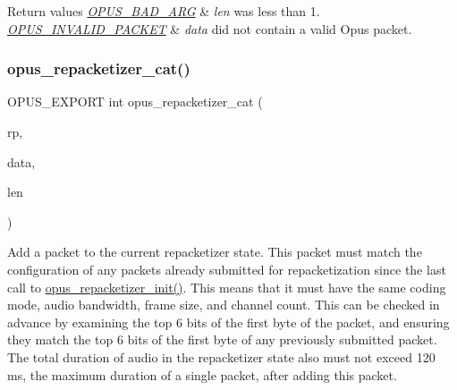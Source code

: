 \begin{DoxyRetVals}{Return values}
{\em \hyperlink{group__opus__errorcodes_gaf2d43e479455a1a3b6874e5faf4e827d}{O\+P\+U\+S\+\_\+\+B\+A\+D\+\_\+\+A\+RG}} & {\itshape len} was less than 1. \\
\hline
{\em \hyperlink{group__opus__errorcodes_ga46fc9dd493fb8e291bd8e838f0988bb7}{O\+P\+U\+S\+\_\+\+I\+N\+V\+A\+L\+I\+D\+\_\+\+P\+A\+C\+K\+ET}} & {\itshape data} did not contain a valid Opus packet. \\
\hline
\end{DoxyRetVals}
\mbox{\label{group__opus__repacketizer_gaa739f0bbc0ad09ad159ffb6455a6bb55}} 
\subsubsection{\texorpdfstring{opus\+\_\+repacketizer\+\_\+cat()}{opus\_repacketizer\_cat()}}
{\footnotesize\ttfamily O\+P\+U\+S\+\_\+\+E\+X\+P\+O\+RT int opus\+\_\+repacketizer\+\_\+cat (\begin{DoxyParamCaption}\item[{\hyperlink{group__opus__repacketizer_ga1f85070a64bcbf5bf24f5ccb80323e7b}{Opus\+Repacketizer} $\ast$}]{rp,  }\item[{\hyperlink{zconf_8h_a2c212835823e3c54a8ab6d95c652660e}{const} unsigned char $\ast$}]{data,  }\item[{\hyperlink{opus__types_8h_aa4d309d6f80b99dbabebc8f98879ab9a}{opus\+\_\+int32}}]{len }\end{DoxyParamCaption})}

Add a packet to the current repacketizer state. This packet must match the configuration of any packets already submitted for repacketization since the last call to \hyperlink{group__opus__repacketizer_gadef533688e80dcc96a32b955657aaf28}{opus\+\_\+repacketizer\+\_\+init()}. This means that it must have the same coding mode, audio bandwidth, frame size, and channel count. This can be checked in advance by examining the top 6 bits of the first byte of the packet, and ensuring they match the top 6 bits of the first byte of any previously submitted packet. The total duration of audio in the repacketizer state also must not exceed 120 ms, the maximum duration of a single packet, after adding this packet.

